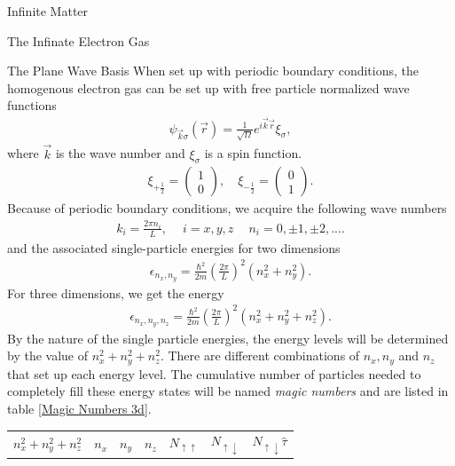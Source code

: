 \documentclass[twoside,english]{uiofysmaster}
\begin{document}
\begin{chapter}{Infinite Matter}
\begin{section}{The Infinate Electron Gas}
		\begin{subsection}{The Plane Wave Basis}
			When set up with periodic boundary conditions, the homogenous electron gas can be set up with free particle normalized wave functions
			\begin{align}
				\psi_{\vec k \sigma} (\vec r) = \frac{1}{\sqrt{\Omega}} e^{i \vec k \vec r} \xi_{\sigma},
			\end{align}
			where $\vec k$ is the wave number and $\xi_{\sigma}$ is a spin function. 
			\begin{align}
				\xi_{+\frac{1}{2}} = \left( \begin{matrix} 1 \\ 0 \end{matrix} \right), \:\;\:\; \xi_{-\frac{1}{2}} = \left( \begin{matrix} 0 \\ 1 \end{matrix} \right).
			\end{align}
			Because of periodic boundary conditions, we acquire the following wave numbers
			\begin{align}
				k_i = \frac{2\pi n_i}{L}, \:\:\:\;\; i = x,y,z \;\;\:\:\: n_i = 0, \pm 1, \pm 2, ... .
			\end{align}
			and the associated single-particle energies for two dimensions
			\begin{align}
				\epsilon_{n_x,n_y} = \frac{\hbar^2}{2m} \left( \frac{2\pi}{L} \right)^2 (n_x^2 + n_y^2).
			\end{align}
			For three dimensions, we get the energy 
			\begin{align}
				\epsilon_{n_x,n_y,n_z} = \frac{\hbar^2}{2m} \left( \frac{2\pi}{L} \right)^2 (n_x^2 + n_y^2 + n_z^2 ).
			\end{align}
			By the nature of the single particle energies, the energy levels will be determined by the value of $n_x^2 + n_y^2 + n_z^2$. There are different combinations of $n_x, n_y$ and $n_z$ that set up each energy level. The cumulative number of particles needed to completely fill these energy states will be named \textit{magic numbers} and are listed in table \ref{Magic Numbers 3d}. 
			\begin{table}[H]
				\begin{center}
					\begin{tabular}[center]{l | c c c | c | c | r }
						$n_x^2 + n_y^2 + n_z^2$ & $n_x$ & $n_y$ & $n_z$ & $N_{\uparrow \uparrow}$ & $N_{\uparrow \downarrow}$ & $N_{\uparrow \downarrow} \hat \tau$ \\

\end{tabular}
\end{center}
\end{table}
\end{subsection}
\end{section}
\end{chapter}
\end{document}
